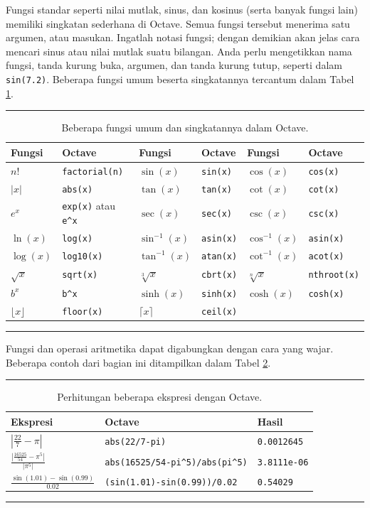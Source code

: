 Fungsi standar seperti nilai mutlak, sinus, dan kosinus (serta banyak
fungsi lain) memiliki singkatan sederhana di Octave. Semua fungsi
tersebut menerima satu argumen, atau masukan. Ingatlah notasi fungsi;
dengan demikian akan jelas cara mencari sinus atau nilai mutlak suatu
bilangan. Anda perlu mengetikkan nama fungsi, tanda kurung buka, argumen,
dan tanda kurung tutup, seperti dalam \texttt{sin(7.2)}. Beberapa
fungsi umum beserta singkatannya tercantum dalam Tabel \ref{tab:commonOctave}.
\begin{table}[h]
\hrule \caption{\label{tab:commonOctave}Beberapa fungsi umum dan singkatannya dalam
Octave.}

\medskip{}

\centering{}%
\begin{tabular}{ll||ll||ll}
Fungsi & Octave & Fungsi & Octave & Fungsi & Octave\tabularnewline
\hline 
$n!$ & \texttt{factorial(n)} & $\sin(x)$ & \texttt{sin(x)} & $\cos(x)$ & \texttt{cos(x)}\tabularnewline
$|x|$ & \texttt{abs(x)} & $\tan(x)$ & \texttt{tan(x)} & $\cot(x)$ & \texttt{cot(x)}\tabularnewline
$e^{x}$ & \texttt{exp(x)} atau \texttt{e\textasciicircum x} & $\sec(x)$ & \texttt{sec(x)} & $\csc(x)$ & \texttt{csc(x)}\tabularnewline
$\ln(x)$ & \texttt{log(x)} & $\sin^{-1}(x)$ & \texttt{asin(x)} & $\cos^{-1}(x)$ & \texttt{asin(x)}\tabularnewline
$\log(x)$ & \texttt{log10(x)} & $\tan^{-1}(x)$ & \texttt{atan(x)} & $\cot^{-1}(x)$ & \texttt{acot(x)}\tabularnewline
$\sqrt{x}$ & \texttt{sqrt(x)} & $\sqrt[3]{x}$ & \texttt{cbrt(x)} & $\sqrt[n]{x}$ & \texttt{nthroot(x)}\tabularnewline
$b^{x}$ & \texttt{b\textasciicircum x} & $\sinh(x)$ & \texttt{sinh(x)} & $\cosh(x)$ & \texttt{cosh(x)}\tabularnewline
$\lfloor x\rfloor$ & \texttt{floor(x)} & $\lceil x\rceil$ & \texttt{ceil(x)} &  & \tabularnewline
\end{tabular}\medskip{}
\hrule 
\end{table}
 Fungsi dan operasi aritmetika dapat digabungkan dengan cara yang
wajar. Beberapa contoh dari bagian ini ditampilkan dalam Tabel \ref{tab:errorExamples}.
\begin{table}[h]
\hrule \caption{\label{tab:errorExamples}Perhitungan beberapa ekspresi dengan Octave.}

\medskip{}

\centering{}%
\begin{tabular}{lll}
Ekspresi & Octave & Hasil\tabularnewline
\hline 
$|\frac{22}{7}-\pi|$ & \texttt{abs(22/7-pi)} & \texttt{0.0012645}\tabularnewline
$\frac{|\frac{16525}{54}-\pi^{5}|}{|\pi^{5}|}$ & \texttt{abs(16525/54-pi\textasciicircum 5)/abs(pi\textasciicircum 5)} & \texttt{3.8111e-06}\tabularnewline
$\frac{\sin(1.01)-\sin(0.99)}{0.02}$ & \texttt{(sin(1.01)-sin(0.99))/0.02} & \texttt{0.54029}\tabularnewline
\end{tabular}\medskip{}
\hrule 
\end{table}
